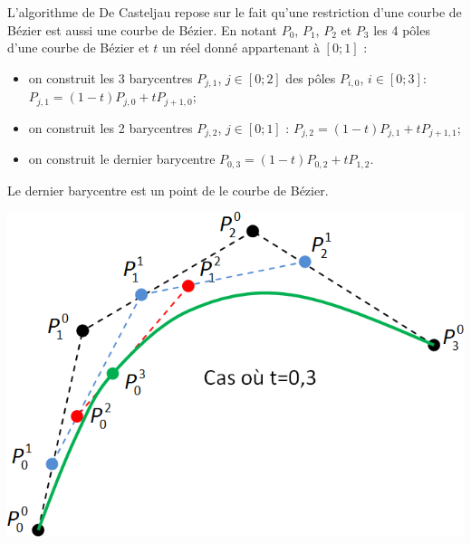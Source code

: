 \documentclass[10pt,fleqn]{article} %
\begin{document}
\begin{minipage}[c]{0.6\linewidth}
L'algorithme de De Casteljau repose sur le fait qu'une restriction d'une courbe de Bézier est aussi une courbe de Bézier. En notant $P_0$, $P_1$, $P_2$ et $P_3$ les 4 pôles d'une courbe de Bézier et $t$ un réel donné appartenant à $[0;1]$ : 
\begin{itemize}[label=,font=\color{ocre}] 
\item on construit les 3 barycentres $P_{j,1}$, $j \in [0;2]$ des pôles $P_{i,0}$, $i\in[0;3]$: $P_{j,1} = \left(1-t\right)P_{j,0} + tP_{{j+1},{0}}$;
\item on construit les 2 barycentres $P_{j,2}$, $j \in [0;1]$ : $P_{j,2} = \left(1-t\right)P_{j,1} + tP_{{j+1},{1}}$;
\item on construit le dernier barycentre  $P_{0,3} = \left(1-t\right)P_{0,2} + tP_{{1},{2}}$.
\end{itemize}
Le dernier barycentre est un point de le courbe de Bézier. 
\end{minipage} \hfill
\begin{minipage}[c]{0.37\linewidth}
\begin{center}
\includegraphics[width=.9\linewidth]{images/casteljau}
\end{center}
\end{minipage}
\fi
\end{document}

